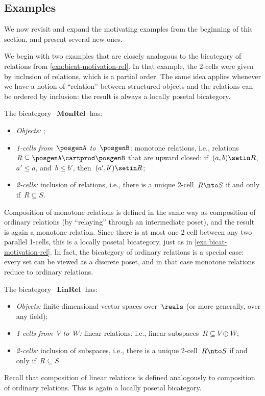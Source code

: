\subsection{Examples}
\label{sec:bicat-examples}

We now revisit and expand the motivating examples from the beginning of this section, and present several new ones.

We begin with two examples that are closely analogous to the bicategory of relations from \cref{exa:bicat-motivation-rel}.
In that example, the 2-cells were given by inclusion of relations, which is a partial order.
The same idea applies whenever we have a notion of ``relation'' between structured objects and the relations can be ordered by inclusion: the result is always a locally posetal bicategory.

\begin{example}
    \label{exa:bicat-monotone-rel}
    The bicategory~$\operatorname{\textbf{MonRel}}$ has:
    \begin{itemize}
        \item \emph{Objects:} ;
        \item \emph{1-cells from~$\posgenA$ to~$\posgenB$:} monotone relations, i.e., relations~$R \subseteq \posgenA \cartprod \posgenB$ that are upward closed: if~$(a, b) \setin R$, $a' \leq a$, and~$b \leq b'$, then~$(a', b') \setin R$;
        \item \emph{2-cells:} inclusion of relations, i.e., there is a unique 2-cell~$R \nto S$ if and only if~$R \subseteq S$.
    \end{itemize}
    Composition of monotone relations is defined in the same way as composition of ordinary relations (by ``relaying'' through an intermediate poset), and the result is again a monotone relation.
    Since there is at most one 2-cell between any two parallel 1-cells, this is a locally posetal bicategory, just as in \cref{exa:bicat-motivation-rel}.
    In fact, the bicategory of ordinary relations is a special case: every set can be viewed as a discrete poset, and in that case monotone relations reduce to ordinary relations.
\end{example}

\begin{example}
    \label{exa:bicat-linear-rel}
    The bicategory~$\operatorname{\textbf{LinRel}}$ has:
    \begin{itemize}
        \item \emph{Objects:} finite-dimensional vector spaces over~$\reals$ (or more generally, over any field);
        \item \emph{1-cells from~$V$ to~$W$:} linear relations, i.e., linear subspaces~$R \subseteq V \oplus W$;
        \item \emph{2-cells:} inclusion of subspaces, i.e., there is a unique 2-cell~$R \nto S$ if and only if~$R \subseteq S$.
    \end{itemize}
    Recall that composition of linear relations is defined analogously to composition of ordinary relations.
    This is again a locally posetal bicategory.
\end{example}

